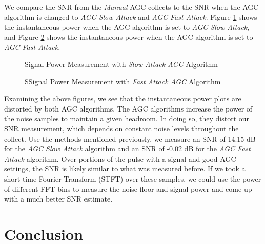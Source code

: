 \documentclass{article}
\begin{document}
We compare the SNR from the \textit{Manual} AGC collects to the SNR when the AGC algorithm is changed to \textit{AGC Slow Attack} and \textit{AGC Fast Attack}. Figure \ref{fig::snr_agc_slow_attack_30db_tx_atten} shows the instantaneous power when the AGC algorithm is set to \textit{AGC Slow Attack}, and Figure \ref{fig::snr_agc_fast_attack_30db_tx_atten} shows the instantaneous power when the AGC algorithm is set to \textit{AGC Fast Attack}.

\begin{figure}[H]
	\centerline{}
	\caption{Signal Power Measurement with \textit{Slow Attack AGC} Algorithm}
	\label{fig::snr_agc_slow_attack_30db_tx_atten}
\end{figure}

\begin{figure}[H]
	\centerline{}
	\caption{SSignal Power Measurement with \textit{Fast Attack AGC} Algorithm}
	\label{fig::snr_agc_fast_attack_30db_tx_atten}
\end{figure}

Examining the above figures, we see that the instantaneous power plots are distorted by both AGC algorithms. The AGC algorithms increase the power of the noise samples to maintain a given headroom. In doing so, they distort our SNR measurement, which depends on constant noise levels throughout the collect. Use the methods mentioned previously, we measure an SNR of 14.15 dB for the \textit{AGC Slow Attack} algorithm and an SNR of -0.02 dB for the \textit{AGC Fast Attack} algorithm. Over portions of the pulse with a signal and good AGC settings, the SNR is likely similar to what was measured before. If we took a short-time Fourier Transform (STFT) over these samples, we could use the power of different FFT bins to measure the noise floor and signal power and come up with a much better SNR estimate. 

\section{Conclusion}

\nocite{analog_devices_libiio_error}

{}
%
	
\end{document}
